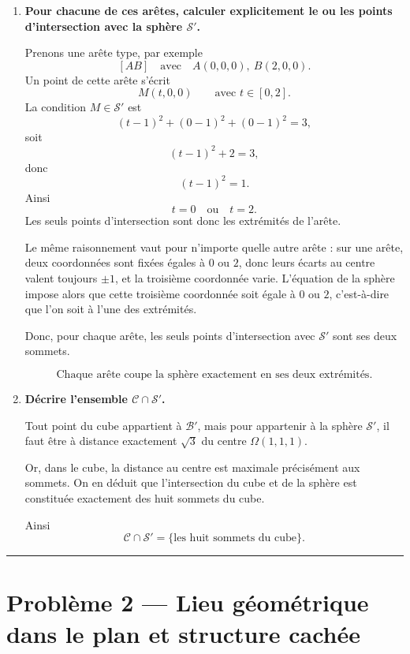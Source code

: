 \documentclass[11pt,a4paper]{article}
\newcommand{\Boule}{\mathcal{B}}
\newcommand{\Sphere}{\mathcal{S}}
\newcommand{\Cube}{\mathcal{C}}
\begin{document}
\begin{enumerate}[label=\textbf{\arabic*.},resume]
    Ainsi
    \[
    \boxed{\text{toutes les arêtes du cube rencontrent la sphère } \Sphere'.}
    \]

    \item \textbf{Pour chacune de ces arêtes, calculer explicitement le ou les points d'intersection avec la sphère \(\Sphere'\).}

    Prenons une arête type, par exemple
    \[
    [AB]\quad\text{avec}\quad A(0,0,0),\ B(2,0,0).
    \]
    Un point de cette arête s'écrit
    \[
    M(t,0,0)\qquad \text{avec } t\in[0,2].
    \]
    La condition \(M\in\Sphere'\) est
    \[
    (t-1)^2+(0-1)^2+(0-1)^2=3,
    \]
    soit
    \[
    (t-1)^2+2=3,
    \]
    donc
    \[
    (t-1)^2=1.
    \]
    Ainsi
    \[
    t=0\quad \text{ou}\quad t=2.
    \]
    Les seuls points d'intersection sont donc les extrémités de l'arête.

    Le même raisonnement vaut pour n'importe quelle autre arête : sur une arête, deux coordonnées sont fixées égales à \(0\) ou \(2\), donc leurs écarts au centre valent toujours \(\pm1\), et la troisième coordonnée varie. L'équation de la sphère impose alors que cette troisième coordonnée soit égale à \(0\) ou \(2\), c'est-à-dire que l'on soit à l'une des extrémités.

    Donc, pour chaque arête, les seuls points d'intersection avec \(\Sphere'\) sont ses deux sommets.

    \[
    \boxed{\text{Chaque arête coupe la sphère exactement en ses deux extrémités.}}
    \]

    \item \textbf{Décrire l'ensemble \(\Cube\cap\Sphere'\).}

    Tout point du cube appartient à \(\Boule'\), mais pour appartenir à la sphère \(\Sphere'\), il faut être à distance exactement \(\sqrt3\) du centre \(\Omega(1,1,1)\).

    Or, dans le cube, la distance au centre est maximale précisément aux sommets.  
    On en déduit que l'intersection du cube et de la sphère est constituée exactement des huit sommets du cube.

    Ainsi
    \[
    \boxed{\Cube\cap\Sphere'=\{\text{les huit sommets du cube}\}.}
    \]
\end{enumerate}

\vspace{1em}
\hrule
\vspace{1em}

\section*{Problème 2 --- Lieu géométrique dans le plan et structure cachée}
\end{document}
